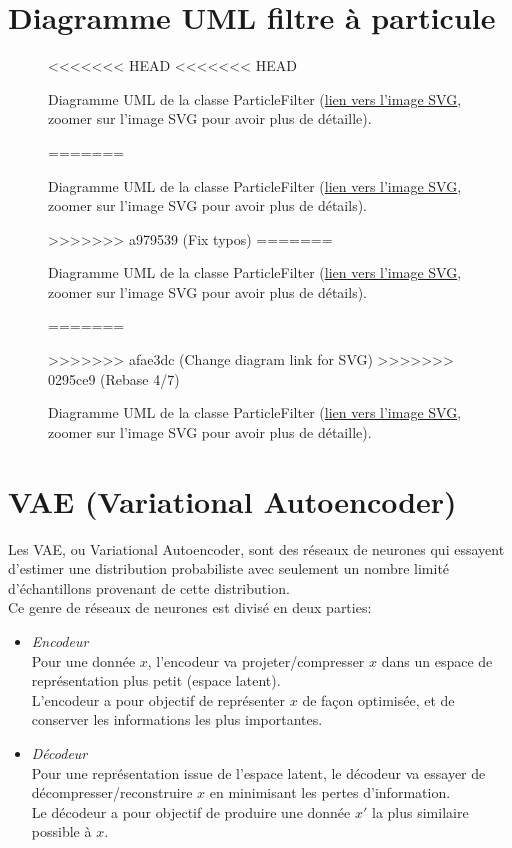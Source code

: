 \begin{appendices}
\clearpage
\section*{Diagramme UML filtre à particule}\label{app:UMLParticleFilter}
\begin{figure}[!htbp]
	\center
<<<<<<< HEAD
<<<<<<< HEAD
	\caption{Diagramme UML de la classe ParticleFilter (\href{https://raw.githubusercontent.com/gabriel-combe/Cuttlefish_Tracker/main/rapport/UML/particlefilter.svg}{lien vers l'image SVG}, zoomer sur l'image SVG pour avoir plus de détaille).}
=======
	\caption{Diagramme UML de la classe ParticleFilter (\href{https://raw.githubusercontent.com/gabriel-combe/Cuttlefish_Tracker/main/rapport/UML/particlefilter.svg}{lien vers l'image SVG}, zoomer sur l'image SVG pour avoir plus de détails).}
>>>>>>> a979539 (Fix typos)
=======
	\caption{Diagramme UML de la classe ParticleFilter (\href{https://raw.githubusercontent.com/gabriel-combe/Cuttlefish_Tracker/main/rapport/UML/particlefilter.svg}{lien vers l'image SVG}, zoomer sur l'image SVG pour avoir plus de détails).}
=======
	\caption{Diagramme UML de la classe ParticleFilter (\href{https://raw.githubusercontent.com/gabriel-combe/Cuttlefish_Tracker/test/rapport/UML/particlefilter.svg}{lien vers l'image SVG}, zoomer sur l'image SVG pour avoir plus de détaille).}
>>>>>>> afae3dc (Change diagram link for SVG)
>>>>>>> 0295ce9 (Rebase 4/7)
	\label{fig:uml_diagram_particlefilter}
\end{figure}
\FloatBarrier
	
	
\clearpage
\section*{VAE (Variational Autoencoder)}\label{app:variational_autoencoder}
Les VAE, ou Variational Autoencoder, sont des réseaux de neurones qui essayent d'estimer une distribution probabiliste avec seulement un nombre limité d'échantillons provenant de cette distribution.\\
Ce genre de réseaux de neurones est divisé en deux parties:\\
\begin{itemize}
	\item \emph{Encodeur}\\
	Pour une donnée $x$, l'encodeur va projeter/compresser $x$ dans un espace de représentation plus petit (espace latent).\\
	L'encodeur a pour objectif de représenter $x$ de façon optimisée, et de conserver les informations les plus importantes.\\
	\item \emph{Décodeur}\\
	Pour une représentation issue de l'espace latent, le décodeur va essayer de décompresser/reconstruire $x$ en minimisant les pertes d'information.\\
	Le décodeur a pour objectif de produire une donnée $x'$ la plus similaire possible à $x$.\\
\end{itemize}
	

\end{appendices}
